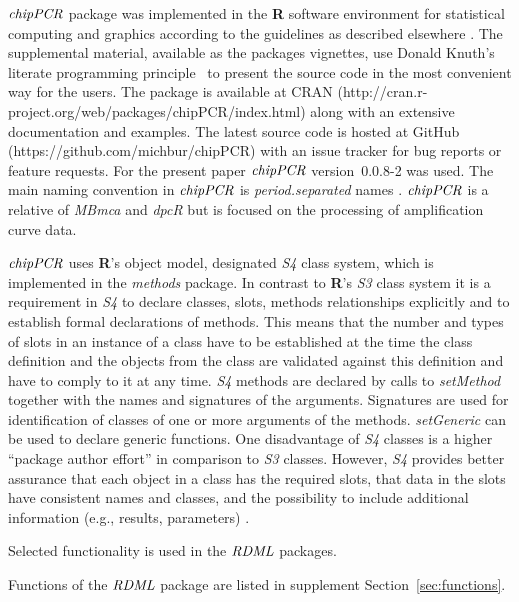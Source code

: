\documentclass[twocolumn]{bmcart}%
\begin{document}
$\emph{chipPCR}$ package was implemented in the \textbf{R} software environment 
for statistical computing and graphics according to the guidelines as described 
elsewhere \cite{RDCT2014a}. The supplemental material, available as the packages 
vignettes, use Donald Knuth's literate programming principle~\cite{Knuth1984} to 
present the source code in the most convenient way for the users. The package is 
available at CRAN 
(http://cran.r-project.org/web/packages/chipPCR/index.html) along with an 
extensive documentation and examples. The latest source code is hosted at GitHub 
(https://github.com/michbur/chipPCR) with an issue tracker for bug reports 
or feature requests. For the present paper $\emph{chipPCR}$ version~0.0.8-2 was 
used. The main naming convention in $\emph{chipPCR}$ is 
\textit{period.separated} names \cite{Baaaath_2012}. $\emph{chipPCR}$ is a 
relative of \emph{MBmca} \cite{roediger_RJ_2013} and \emph{dpcR} 
\cite{burdukiewicz_2014} but is focused on the processing of amplification curve 
data.
  
  $\emph{chipPCR}$ uses \textbf{R}’s object model, designated \emph{S4} class 
system, which is implemented in the \emph{methods} package. In contrast to 
\textbf{R}’s \emph{S3} class system it is a requirement in \emph{S4} to declare 
classes, slots, methods relationships explicitly and to establish formal 
declarations of methods. This means that the number and types of slots in an 
instance of a class have to be established at the time the class definition and 
the objects from the class are validated against this definition and have to 
comply to it at any time. \emph{S4} methods are declared by calls to 
\textsl{setMethod} together with the names and signatures of the arguments. 
Signatures are used for identification of classes of one or more arguments of 
the methods. \textsl{setGeneric} can be used to declare generic functions. One 
disadvantage of \emph{S4} classes is a higher ``package author effort'' in 
comparison to \emph{S3} classes. However, \emph{S4} provides better assurance 
that each object in a class has the required slots, that data in the slots have 
consistent names and classes, and the possibility to include additional 
information (e.g., results, parameters) \cite{Karatzoglou_2004}.

Selected functionality is used in the $\emph{RDML}$ \cite{blagodatskikh_2014} packages.

Functions of the $\emph{RDML}$ package are listed in supplement Section~\ref{sec:functions}.
\end{document}

